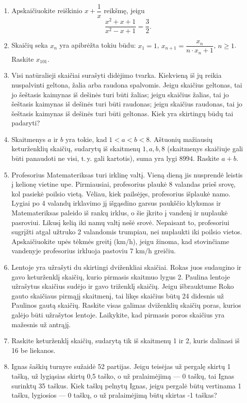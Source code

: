 \documentclass[11pt,a4paper]{article}
\begin{document}
\begin{enumerate}
    \item Apskaičiuokite reiškinio $x + \dfrac{1}{x}$ reikšmę, jeigu
    \[
    \frac{x^2 + x + 1}{x^2 - x + 1} = \frac{3}{2}.
    \]

    \item Skaičių seka $x_n$ yra apibrėžta tokiu būdu: $x_1 = 1$, $x_{n+1} = \dfrac{x_n}{n \cdot x_n + 1}$, $n \ge 1$. Raskite $x_{101}$.

    \item Visi natūralieji skaičiai surašyti didėjimo tvarka. Kiekvieną iš jų reikia nuspalvinti geltona, žalia arba raudona spalvomis. Jeigu skaičius geltonas, tai jo šeštasis kaimynas iš dešinės turi būti žalias; jeigu skaičius žalias, tai jo šeštasis kaimynas iš dešinės turi būti raudonas; jeigu skaičius raudonas, tai jo šeštasis kaimynas iš dešinės turi būti geltonas. Kiek yra skirtingų būdų tai padaryti?

    \item Skaitmenys $a$ ir $b$ yra tokie, kad $1 < a < b < 8$. Aštuonių mažiausių keturženklių skaičių, sudarytų iš skaitmenų $1, a, b, 8$ (skaitmenys skaičiuje gali būti panaudoti ne visi, t.\,y. gali kartotis), suma yra lygi $8994$. Raskite $a + b$.

    \item Profesorius Matemateriksas turi irklinę valtį. Vieną dieną jis nusprendė leistis į kelionę vietine upe. Pirmiausiai, profesorius plaukė 8 valandas prieš srovę, kol pasiekė poilsio vietą. Vėliau, kiek pailsėjęs, profesorius išplaukė namo. Lygiai po 4 valandų irklavimo jį išgąsdino garsus paukščio klyksmas ir Matemateriksas paleido iš rankų irklus, o šie įkrito į vandenį ir nuplaukė pasroviui. Likusį kelią iki namų valtį nešė srovė. Nepaisant to, profesoriui sugrįžti atgal užtruko 2 valandomis trumpiau, nei nuplaukti iki poilsio vietos. Apskaičiuokite upės tėkmės greitį (km/h), jeigu žinoma, kad stovinčiame vandenyje profesorius irkluoja pastoviu $7\text{ km/h}$ greičiu.

    \item Lentoje yra užrašyti du skirtingi dviženkliai skaičiai. Rokas juos sudaugino ir gavo keturženklį skaičių, kurio pirmasis skaitmuo lygus 2. Paulina lentoje užrašytus skaičius sudėjo ir gavo triženklį skaičių. Jeigu išbrauktume Roko gauto skaičiaus pirmąjį skaitmenį, tai likęs skaičius būtų 24 didesnis už Paulinos gautą skaičių. Raskite visas galimas dviženklių skaičių poras, kurios galėjo būti užrašytos lentoje. Laikykite, kad pirmasis poros skaičius yra mažesnis už antrąjį.

    \item Raskite keturženklį skaičių, sudarytą tik iš skaitmenų 1 ir 2, kuris dalinasi iš 16 be liekanos.

    \item Ignas šaškių turnyre sužaidė 52 partijas. Jeigu teisėjas už pergalę skirtų 1 tašką, už lygiąsias skirtų 0,5 taško, o už pralaimėjimą --- 0 taškų, tai Ignas surinktų 35 taškus. Kiek taškų pelnytų Ignas, jeigu pergalė būtų vertinama 1 tašku, lygiosios --- 0 taškų, o už pralaimėjimą būtų skirtas -1 taškas?
\end{enumerate}
\end{document}
